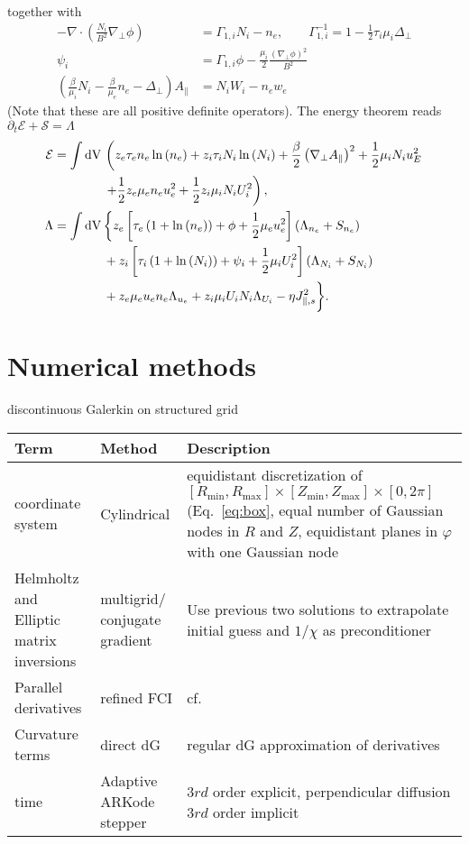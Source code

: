 together with
  \begin{align}
    -\nabla\cdot\left( \frac{N_i}{B^2}\nabla_\perp \phi \right) &= \Gamma_{1,i} N_i - n_e, \quad\quad
    \Gamma_{1,i}^{-1} = 1-\frac{1}{2}\tau_i\mu_i \Delta_\perp \\
    \psi_i &= \Gamma_{1,i}\phi -\frac{\mu_i}{2}\frac{(\nabla_\perp\phi)^2}{B^2} \\
    \left(\frac{\beta}{\mu_i}N_i - \frac{\beta}{\mu_e}n_e-\Delta_\perp\right)
    A_\parallel &= N_iW_i-n_e w_e
  \end{align}
  (Note that these are all positive definite operators).
The energy theorem reads $\partial_t \mathcal E + \mathcal S = \Lambda$
\begin{align}
  \mathcal{E}= \int  \mathrm{dV}\, & \left( z_e\tau_e n_e \ln{(n_e)} +z_i\tau_i N_i\ln{(N_i)}
  +\frac{\beta}{2}\left(\nabla_\perp A_\parallel\right)^2
   +  \frac{1}{2} \mu_i N_i u_E^2  \right .\nonumber\\
   &\left. +\frac{1}{2} z_e\mu_e  n_e u_e^2
  +\frac{1}{2} z_i\mu_i  N_i U_i^2  \right),\\
  \Lambda =  \int \mathrm{dV}\, & \bigg\{  z_e\left[\tau_e\left( 1+\ln{(n_e)}\right) + \phi + \frac{1}{2} \mu_e u_e^2 \right](\Lambda_{n_e} + S_{n_e})
  \nonumber\\ &
+z_i\left[\tau_i\left( 1+\ln{(N_i)}\right) + \psi_i + \frac{1}{2} \mu_i U_i^2 \right](\Lambda_{N_i}+S_{N_i})
\nonumber \\ &
+ z_e\mu_e u_e n_e \Lambda_{u_e}+z_i\mu_iU_i N_i \Lambda_{U_i} - \eta J_{\parallel,s}^2\bigg\}.
\end{align}

\section{Numerical methods}
discontinuous Galerkin on structured grid
\begin{longtable}{p{3cm}l>{\RaggedRight}p{7cm}}
\toprule
\rowcolor{gray!50}\textbf{Term} &  \textbf{Method} & \textbf{Description}  \\ \midrule
    coordinate system & Cylindrical & equidistant discretization of $[R_{\min},R_{\max}] \times [Z_{\min},Z_{\max}] \times [0,2\pi]$ (Eq.~\eqref{eq:box}, equal number of Gaussian nodes in $R$ and $Z$, equidistant planes in $\varphi$ with one Gaussian node \\
Helmholtz and Elliptic matrix inversions & multigrid/ conjugate gradient & Use previous two solutions to extrapolate initial guess and $1/\chi$ as preconditioner \\
Parallel derivatives & refined  FCI & cf.~\cite{Held2016,Stegmeir2017} \\
Curvature terms & direct dG & regular dG approximation of derivatives \\
time & Adaptive ARKode stepper & $3rd$ order explicit, perpendicular diffusion $3rd$ order implicit \\
\bottomrule
\end{longtable}
